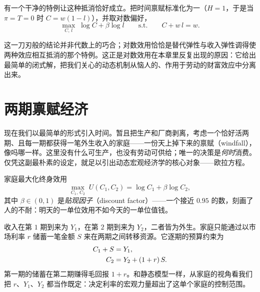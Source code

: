 有一个干净的特例让这种抵消恰好成立。把时间禀赋标准化为一（$H=1$，于是当 $\pi=T=0$ 时 $C = w(1-l)$），并取对数偏好，
\[
\max_{C,\,l}\; \log C + \beta \log l
\qquad \text{s.t.} \qquad C + w\,l = w.
\]


这一刀刃般的结论并非代数上的巧合；对数效用恰恰是替代弹性与收入弹性调得使两种效应相互抵消的那个特例。这正是对数效用在本章里反复出现的原因：它给出最简单的闭式解，把我们关心的动态机制从恼人的、作用于劳动的财富效应中分离出来。

\section{两期禀赋经济}

现在我们以最简单的形式引入时间。暂且把生产和厂商剥离，考虑一个恰好活两期、且每一期都获得一笔外生收入的家庭——一份天上掉下来的禀赋（windfall），像吗哪一样。这里没有什么可生产，也没有劳动可供给；唯一的决策是\emph{何时}消费。仅凭这副最朴素的设定，就足以引出动态宏观经济学的核心对象——欧拉方程。

家庭最大化终身效用
\[
\max_{C_1,\,C_2}\; U(C_1, C_2) = \log C_1 + \beta \log C_2,
\]
其中 $\beta \in (0,1)$ 是\emph{贴现因子}（discount factor）——一个接近 $0.95$ 的数，刻画了人的不耐：明天的一单位效用不如今天的一单位值钱。


收入在第 $1$ 期到来为 $Y_1$，在第 $2$ 期到来为 $Y_2$，二者皆为外生。家庭只能通过以市场利率 $r$ 储蓄一笔金额 $S$ 来在两期之间转移资源。它逐期的预算约束为
\[
\begin{aligned}
C_1 + S &= Y_1, \\
C_2 &= Y_2 + (1+r)\,S.
\end{aligned}
\]
第一期的储蓄在第二期赚得毛回报 $1+r$。和静态模型一样，从家庭的视角看我们把 $r$、$Y_1$、$Y_2$ 都当作既定：决定利率的宏观力量超出了这单个家庭的控制范围。

